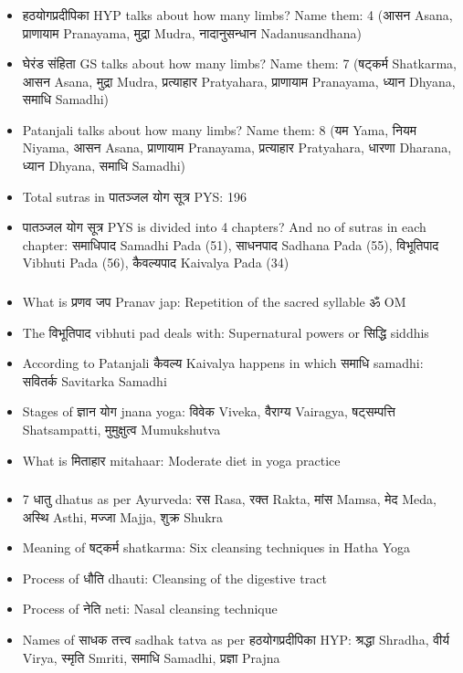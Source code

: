 \begin{frame}[fragile]\frametitle{}
\begin{itemize}
\item हठयोगप्रदीपिका HYP talks about how many limbs? Name them: 4 (आसन Asana, प्राणायाम Pranayama, मुद्रा Mudra, नादानुसन्धान Nadanusandhana)
\item घेरंड संहिता GS talks about how many limbs? Name them: 7 (षट्कर्म Shatkarma, आसन Asana, मुद्रा Mudra, प्रत्याहार Pratyahara, प्राणायाम Pranayama, ध्यान Dhyana, समाधि Samadhi)
\item Patanjali talks about how many limbs? Name them: 8 (यम Yama, नियम Niyama, आसन Asana, प्राणायाम Pranayama, प्रत्याहार Pratyahara, धारणा Dharana, ध्यान Dhyana, समाधि Samadhi)
\item Total sutras in पातञ्जल योग सूत्र PYS: 196
\item पातञ्जल योग सूत्र PYS is divided into 4 chapters? And no of sutras in each chapter: समाधिपाद Samadhi Pada (51), साधनपाद Sadhana Pada (55), विभूतिपाद Vibhuti Pada (56), कैवल्यपाद Kaivalya Pada (34)
\end{itemize}
\end{frame}

\begin{frame}[fragile]\frametitle{}
\begin{itemize}
\item What is प्रणव जप Pranav jap: Repetition of the sacred syllable ॐ OM
\item The विभूतिपाद vibhuti pad deals with: Supernatural powers or सिद्धि siddhis
\item According to Patanjali कैवल्य Kaivalya happens in which समाधि samadhi: सवितर्क Savitarka Samadhi
\item Stages of ज्ञान योग jnana yoga: विवेक Viveka, वैराग्य Vairagya, षट्सम्पत्ति Shatsampatti, मुमुक्षुत्व Mumukshutva
\item What is मिताहार mitahaar: Moderate diet in yoga practice
\end{itemize}
\end{frame}

\begin{frame}[fragile]\frametitle{}
\begin{itemize}
\item 7 धातु dhatus as per Ayurveda: रस Rasa, रक्त Rakta, मांस Mamsa, मेद Meda, अस्थि Asthi, मज्जा Majja, शुक्र Shukra
\item Meaning of षट्कर्म shatkarma: Six cleansing techniques in Hatha Yoga
\item Process of धौति dhauti: Cleansing of the digestive tract
\item Process of नेति neti: Nasal cleansing technique
\item Names of साधक तत्त्व sadhak tatva as per हठयोगप्रदीपिका HYP: श्रद्धा Shradha, वीर्य Virya, स्मृति Smriti, समाधि Samadhi, प्रज्ञा Prajna
\end{itemize}
\end{frame}

